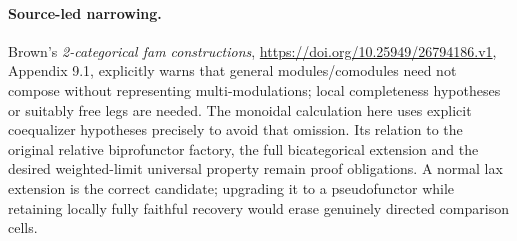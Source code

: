 \documentclass{article}
\begin{document}
\paragraph{Source-led narrowing.} Brown's \emph{2-categorical fam constructions}, \url{https://doi.org/10.25949/26794186.v1}, Appendix 9.1, explicitly warns that general modules/comodules need not compose without representing multi-modulations; local completeness hypotheses or suitably free legs are needed. The monoidal calculation here uses explicit coequalizer hypotheses precisely to avoid that omission. Its relation to the original relative biprofunctor factory, the full bicategorical extension and the desired weighted-limit universal property remain proof obligations. A normal lax extension is the correct candidate; upgrading it to a pseudofunctor while retaining locally fully faithful recovery would erase genuinely directed comparison cells.
\end{document}
